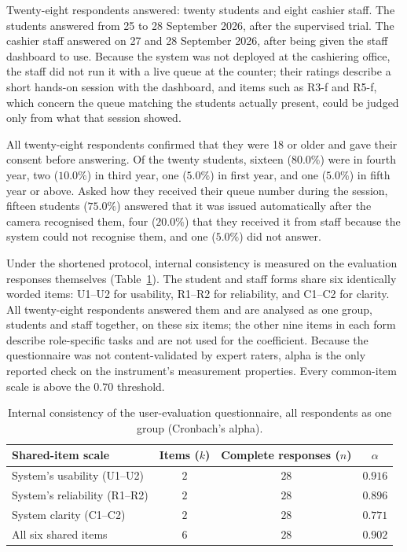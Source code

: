 \documentclass{research}
\begin{document}
Twenty-eight respondents answered: twenty students and eight cashier
staff. The students answered from 25 to 28 September 2026, after the
supervised trial. The cashier staff answered on 27 and 28 September
2026, after being given the staff dashboard to use. Because the system
was not deployed at the cashiering office, the staff did not run it with
a live queue at the counter; their ratings describe a short hands-on
session with the dashboard, and items such as R3-f and R5-f, which
concern the queue matching the students actually present, could be
judged only from what that session showed.

\label{subsec:sop4-profile}

All twenty-eight respondents confirmed that they were 18 or older and gave
their consent before answering. Of the twenty students, sixteen
($80.0\%$) were in fourth year, two ($10.0\%$) in third year, one
($5.0\%$) in first year, and one ($5.0\%$) in fifth year or above. Asked
how they received their queue number during the session, fifteen students
($75.0\%$) answered that it was issued automatically after the camera
recognised them, four ($20.0\%$) that they received it from staff because
the system could not recognise them, and one ($5.0\%$) did not answer.

\label{subsec:sop4-reliability}

Under the shortened protocol, internal consistency is measured on the
evaluation responses themselves (Table~\ref{tab:sop4-reliability}). The
student and staff forms share six identically worded items: U1--U2 for
usability, R1--R2 for reliability, and C1--C2 for clarity. All
twenty-eight respondents answered them and are analysed as one group,
students and staff together, on these six items; the other nine items in
each form describe role-specific tasks and are not used for the
coefficient. Because the questionnaire was not
content-validated by expert raters, alpha is the only reported check on
the instrument's measurement properties. Every common-item scale is
above the $0.70$ threshold.

\begin{table}[H]
\centering
\caption{Internal consistency of the user-evaluation questionnaire, all
respondents as one group (Cronbach's alpha).}
\label{tab:sop4-reliability}
\begin{tabular}{lccc}
\hline
Shared-item scale & Items ($k$) & Complete responses ($n$) & $\alpha$ \\
\hline
System's usability (U1--U2) & $2$ & $28$ & $0.916$ \\
System's reliability (R1--R2) & $2$ & $28$ & $0.896$ \\
System clarity (C1--C2) & $2$ & $28$ & $0.771$ \\
All six shared items & $6$ & $28$ & $0.902$ \\
\hline
\end{tabular}
\end{table}
\end{document}
